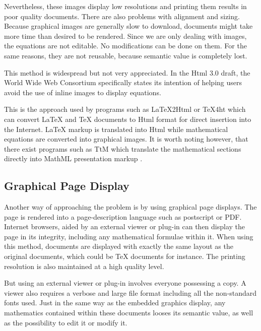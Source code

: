 Nevertheless, these images display low resolutions and printing them results in poor quality documents. There are also
problems with alignment and sizing. Because graphical images are generally slow to download, documents might take more
time than desired to be rendered. Since we are only dealing with images, the equations are not editable. No modifications
can be done on them. For the same reasons, they are not reusable, because semantic value is completely lost.

This method is widespread but not very appreciated. In the Html 3.0 draft, the World Wide Web
Consortium specifically states its intention of helping users avoid the use of inline
images to display equations.

This is the approach used by programs such as \LaTeX\index{\LaTeX}2Html \cite{latex2html} or \TeX\index{\TeX}4ht
\cite{tex4ht} which can convert \LaTeX\index{\LaTeX} and \TeX\index{\TeX} documents to Html format for direct insertion into the
Internet. \LaTeX\index{\LaTeX} markup is translated into Html while mathematical equations are converted into graphical
images. It is worth noting however, that there exist programs such as TtM \cite{TtM} which translate the
mathematical sections directly into MathML presentation markup .

\subsection{Graphical Page Display}

Another way of approaching the problem is by using graphical page displays. The page is rendered into a page-description
language such as postscript or PDF. Internet browsers, aided by an external viewer or plug-in
can then display the page in its integrity, including any mathematical formulae within it. When using this method,
documents are displayed with exactly the same layout as the original documents, which could be \TeX\index{\TeX} documents
for instance. The printing resolution is also maintained at a high quality level.

But using an external viewer or plug-in involves everyone possessing a copy. A viewer also requires a verbose and large
file format including all the non-standard fonts used. Just in the same way as the embedded graphics display, any
mathematics contained within these documents looses its semantic value, as well as the possibility to edit it or modify
it.



